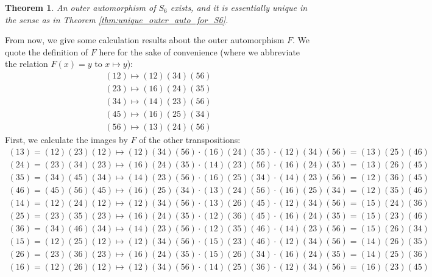 \documentclass[11pt]{article}
\newtheorem{theorem}{Theorem}
\begin{document}
\begin{theorem}
\label{thm:out_S6_exists_uniquely}
An outer automorphism of $S_6$ exists, and it is essentially unique in the sense as in Theorem {\rm \ref{thm:unique_outer_auto_for_S6}}.
\end{theorem}

From now, we give some calculation results about the outer automorphism $F$.
We quote the definition of $F$ here for the sake of convenience (where we abbreviate the relation $F(x) = y$ to $x \mapsto y$):
\begin{displaymath}
\begin{split}
(12) \mapsto (12)(34)(56) \\
(23) \mapsto (16)(24)(35) \\
(34) \mapsto (14)(23)(56) \\
(45) \mapsto (16)(25)(34) \\
(56) \mapsto (13)(24)(56)
\end{split}
\end{displaymath}
First, we calculate the images by $F$ of the other transpositions:
\begin{displaymath}
\begin{split}
(13) = (12)(23)(12) \mapsto (12)(34)(56) \cdot (16)(24)(35) \cdot (12)(34)(56) = (13)(25)(46) \\
(24) = (23)(34)(23) \mapsto (16)(24)(35) \cdot (14)(23)(56) \cdot (16)(24)(35) = (13)(26)(45) \\
(35) = (34)(45)(34) \mapsto (14)(23)(56) \cdot (16)(25)(34) \cdot (14)(23)(56) = (12)(36)(45) \\
(46) = (45)(56)(45) \mapsto (16)(25)(34) \cdot (13)(24)(56) \cdot (16)(25)(34) = (12)(35)(46) \\
(14) = (12)(24)(12) \mapsto (12)(34)(56) \cdot (13)(26)(45) \cdot (12)(34)(56) = (15)(24)(36) \\
(25) = (23)(35)(23) \mapsto (16)(24)(35) \cdot (12)(36)(45) \cdot (16)(24)(35) = (15)(23)(46) \\
(36) = (34)(46)(34) \mapsto (14)(23)(56) \cdot (12)(35)(46) \cdot (14)(23)(56) = (15)(26)(34) \\
(15) = (12)(25)(12) \mapsto (12)(34)(56) \cdot (15)(23)(46) \cdot (12)(34)(56) = (14)(26)(35) \\
(26) = (23)(36)(23) \mapsto (16)(24)(35) \cdot (15)(26)(34) \cdot (16)(24)(35) = (14)(25)(36) \\
(16) = (12)(26)(12) \mapsto (12)(34)(56) \cdot (14)(25)(36) \cdot (12)(34)(56) = (16)(23)(45)
\end{split}
\end{displaymath}
\end{document}
